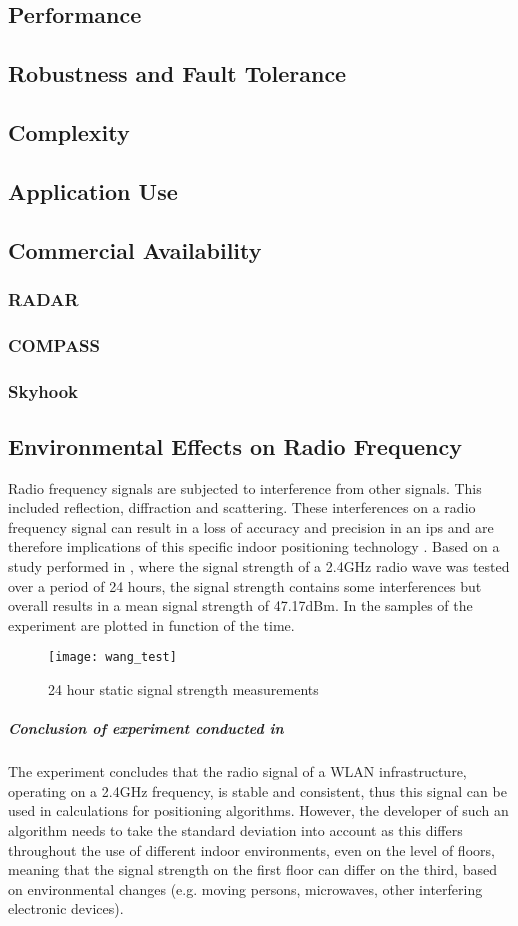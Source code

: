 \subsection{Performance}
\subsection{Robustness and Fault Tolerance}
\subsection{Complexity}
\subsection{Application Use}
\subsection{Commercial Availability}
\subsubsection{RADAR}
\subsubsection{COMPASS}
\subsubsection{Skyhook}
\subsection{Environmental Effects on Radio Frequency}
Radio frequency signals are subjected to interference from other signals. This included reflection, diffraction and scattering. These interferences on a radio frequency signal can result in a loss of accuracy and precision in an \acrlong{ips} and are therefore implications of this specific indoor positioning technology \cite{S2016}. Based on a study performed in \cite{Wang2003}, where the signal strength of a 2.4GHz radio wave was tested over a period of 24 hours, the signal strength contains some interferences but overall results in a mean signal strength of 47.17dBm. In \cite{fig:wang_test} the samples of the experiment are plotted in function of the time.
\begin{figure}[h!]
\centering
\texttt{[image: wang\_test]}
\caption{24 hour static signal strength measurements ~\cite{Wang2003}}
\label{fig:wang_test}
\end{figure}
\subparagraph{Conclusion of experiment conducted in ~\cite{Wang2003}}
The experiment concludes that the radio signal of a WLAN infrastructure, operating on a 2.4GHz frequency, is stable and consistent, thus this signal can be used in calculations for positioning algorithms. However, the developer of such an algorithm needs to take the standard deviation into account as this differs throughout the use of different indoor environments, even on the level of floors, meaning that the signal strength on the first floor can differ on the third, based on environmental changes (e.g. moving persons, microwaves, other interfering electronic devices).

